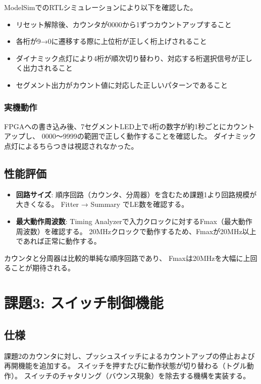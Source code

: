 \documentclass[a4paper,11pt]{ltjsarticle}
\begin{document}
ModelSimでのRTLシミュレーションにより以下を確認した。

\begin{itemize}
\item リセット解除後、カウンタが0000から1ずつカウントアップすること
\item 各桁が9→0に遷移する際に上位桁が正しく桁上げされること
\item ダイナミック点灯により4桁が順次切り替わり、対応する桁選択信号が正しく出力されること
\item セグメント出力がカウント値に対応した正しいパターンであること
\end{itemize}

\subsubsection{実機動作}

FPGAへの書き込み後、7セグメントLED上で4桁の数字が約1秒ごとにカウントアップし、
0000〜9999の範囲で正しく動作することを確認した。
ダイナミック点灯によるちらつきは視認されなかった。

\subsection{性能評価}

\begin{itemize}
\item \textbf{回路サイズ}: 順序回路（カウンタ、分周器）を含むため課題1より回路規模が大きくなる。
  Fitter → Summary でLE数を確認する。
\item \textbf{最大動作周波数}: Timing Analyzerで入力クロックに対するFmax（最大動作周波数）を確認する。
  20MHzクロックで動作するため、Fmaxが20MHz以上であれば正常に動作する。
\end{itemize}

カウンタと分周器は比較的単純な順序回路であり、
Fmaxは20MHzを大幅に上回ることが期待される。


\section{課題3: スイッチ制御機能}

\subsection{仕様}

課題2のカウンタに対し、プッシュスイッチによるカウントアップの停止および再開機能を追加する。
スイッチを押すたびに動作状態が切り替わる（トグル動作）。
スイッチのチャタリング（バウンス現象）を除去する機構を実装する。
\end{document}
